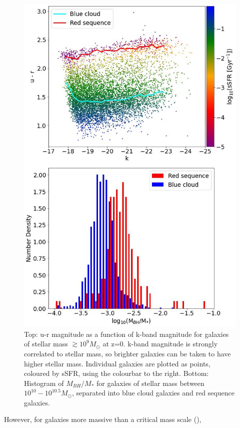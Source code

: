 \documentclass[12pt, twocolumn]{report}%
\begin{document}
\begin{figure}[H]
\centering
\includegraphics[width=15cm]{Plot_1.jpeg}
\caption{Top: u-r magnitude as a function of k-band magnitude for galaxies of stellar mass $\gtrsim10^9M_\odot$ at z=0. k-band magnitude is strongly correlated to stellar mass, so brighter galaxies can be taken to have higher stellar mass. Individual galaxies are plotted as points, coloured by sSFR, using the colourbar to the right. Bottom: Histogram of $M_{BH}/M_*$ for galaxies of stellar mass between $10^{10} - 10^{10.5}M_\odot$, separated into blue cloud galaxies and red sequence galaxies.}
\label{fig:2}
\end{figure}
\twocolumngrid

\noindent However, for galaxies more massive than a critical mass scale (\cite{Quasar}),
\end{document}
